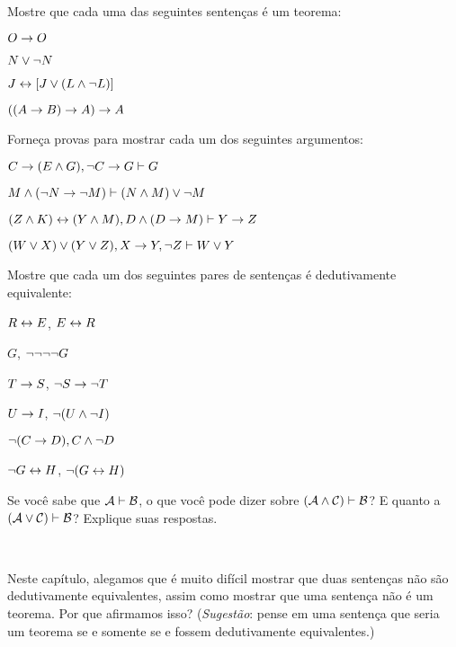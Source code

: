 \practiceproblems
\problempart
Mostre que cada uma das seguintes senten\c cas \'e um teorema:
\begin{earg}
\item $O \rightarrow O$
\item $N \vee \neg N$
\item $J \leftrightarrow [J\vee (L\wedge\neg L)]$
\item $((A \rightarrow B) \rightarrow A) \rightarrow A$ 
\end{earg}

\problempart
Forne\c ca provas para mostrar cada um dos seguintes argumentos:
\begin{earg}
\item $C\rightarrow(E\wedge G), \neg C \rightarrow G \vdash G$
\item $M \wedge (\neg N \rightarrow \neg M) \vdash (N \wedge M) \vee \neg M$
\item $(Z\wedge K)\leftrightarrow(Y\wedge M), D\wedge(D\rightarrow M) \vdash Y\rightarrow Z$
\item $(W \vee X) \vee (Y \vee Z), X\rightarrow Y, \neg Z \vdash W\vee Y$
\end{earg}

\problempart
Mostre que cada um dos seguintes pares de senten\c cas \'e dedutivamente equivalente:
\begin{earg}
\item $R \leftrightarrow E$, $E \leftrightarrow R$
\item $G$, $\neg\neg\neg\neg G$
\item $T\rightarrow S$, $\neg S \rightarrow \neg T$
\item $U \rightarrow I$, $\neg(U \wedge \neg I)$
\item $\neg (C \rightarrow D), C \wedge \neg D$
\item $\neg G \leftrightarrow H$, $\neg(G \leftrightarrow H)$ 
\end{earg}

\problempart
 Se voc\^e sabe que $\mathcal{A}\vdash\mathcal{B}$, o que voc\^e pode dizer sobre $(\mathcal{A}\wedge\mathcal{C})\vdash\mathcal{B}$? E quanto a $(\mathcal{A}\vee\mathcal{C})\vdash\mathcal{B}$? Explique suas respostas.

\

\problempart Neste cap\'itulo, alegamos que \'e muito dif\'icil mostrar que duas senten\c cas n\~ao s\~ao dedutivamente equivalentes, assim como mostrar que uma senten\c ca n\~ao \'e um teorema. Por que afirmamos isso? (\emph{Sugest\~ao}: pense em uma senten\c ca que seria um teorema se e somente se  e  fossem dedutivamente equivalentes.)

